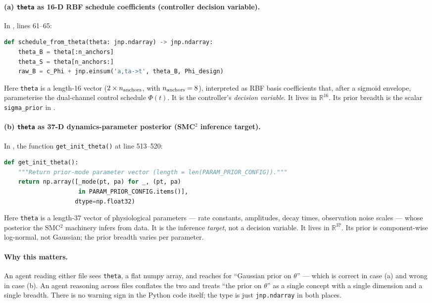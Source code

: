 \documentclass[11pt,a4paper]{article}
\begin{document}
\paragraph{(a) \texttt{theta} as 16-D RBF schedule coefficients
(controller decision variable).} In
, lines 61--65:
\begin{lstlisting}[language=Python]
def schedule_from_theta(theta: jnp.ndarray) -> jnp.ndarray:
    theta_B = theta[:n_anchors]
    theta_S = theta[n_anchors:]
    raw_B = c_Phi + jnp.einsum('a,ta->t', theta_B, Phi_design)
\end{lstlisting}
Here \texttt{theta} is a length-16 vector ($2 \times n_{\rm anchors}$,
with $n_{\rm anchors} = 8$), interpreted as RBF basis coefficients
that, after a sigmoid envelope, parameterise the dual-channel
control schedule $\Phi(t)$. It is the controller's
\emph{decision variable}. It lives in $\mathbb{R}^{16}$. Its prior
breadth is the scalar \texttt{sigma\_prior} in
.

\paragraph{(b) \texttt{theta} as 37-D dynamics-parameter posterior
(SMC$^2$ inference target).} In
, the function
\verb|get_init_theta()| at line 513--520:
\begin{lstlisting}[language=Python]
def get_init_theta():
    """Return prior-mode parameter vector (length = len(PARAM_PRIOR_CONFIG))."""
    return np.array([_mode(pt, pa) for _, (pt, pa)
                     in PARAM_PRIOR_CONFIG.items()],
                    dtype=np.float32)
\end{lstlisting}
Here \texttt{theta} is a length-37 vector of physiological
parameters --- rate constants, amplitudes, decay times, observation
noise scales --- whose posterior the SMC$^2$ machinery infers from
data. It is the inference \emph{target}, not a decision variable.
It lives in $\mathbb{R}^{37}$. Its prior is component-wise
log-normal, not Gaussian; the prior breadth varies per parameter.

\paragraph{Why this matters.} An agent reading either file sees
\texttt{theta}, a flat numpy array, and reaches for ``Gaussian prior
on $\theta$'' --- which is correct in case (a) and wrong in case
(b). An agent reasoning across files conflates the two and treats
``the prior on $\theta$'' as a single concept with a single dimension
and a single breadth. There is no warning sign in the Python code
itself; the type is just \texttt{jnp.ndarray} in both places.
\end{document}
